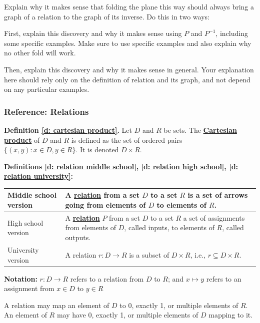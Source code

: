 \documentclass[11pt]{article}
\newcommand{\handout}{\subsubsection}
\renewcommand\subset\subseteq
\newcommand\st{:}
\renewcommand\emph[1]{\underline{\bf{#1}}} %
\theoremstyle{definition}
\begin{document}
\vfill
Explain why it makes sense that folding the plane this way should always bring a graph of a relation to the graph of its inverse. Do this in two ways:
	\begin{itemize*}
	\item First, explain this discovery and why it makes sense using $P$ and $P^{-1}$, including some specific examples. Make sure to use specific examples and also explain why no other fold will work.
	\item Then, explain this discovery and why it makes sense in general. Your explanation here should rely only on the definition of relation and its graph, and not depend on any particular examples. 
	\end{itemize*}
\vfill 

\newpage 
\handout{Reference: Relations}

{\bf Definition \ref{d: cartesian product}.}
Let $D$ and $R$ be sets. The \emph{Cartesian product} of $D$ and $R$ is defined as the set of ordered pairs $\{ (x,y) \st x\in D, y\in R\}$. It is denoted $D\times R$.

\vfill 
{\bf Definitions \ref{d: relation middle school}, \ref{d: relation high school}, \ref{d: relation university}:} \\ 
\begin{tabular}{L{1.25in}|L{5in}}
\hline 
Middle school version  & A \emph{relation} from a set $D$ to a set $R$ is a set of arrows going from elements of $D$ to elements of $R$.   \\  \hline
High school version & A \emph{relation} $P$ from a set $D$ to a set $R$ a set of assignments from elements of $D$, called inputs, to elements of $R$, called outputs. \\  \hline
University version & A relation $r:D\to R$ is a subset of $D\times R$, i.e., $r\subset D\times R$. \\  \hline
\end{tabular}
{\bf Notation:} $r:D\to R$ refers to a relation from $D$ to $R$; and $x\mapsto y$ refers to an assignment from $x\in D$ to $y\in R$

A relation may map an element of $D$ to 0, exactly 1, or multiple elements of $R$.  An element of $R$ may have 0, exactly 1, or multiple elements of $D$ mapping to it.
\end{document}
